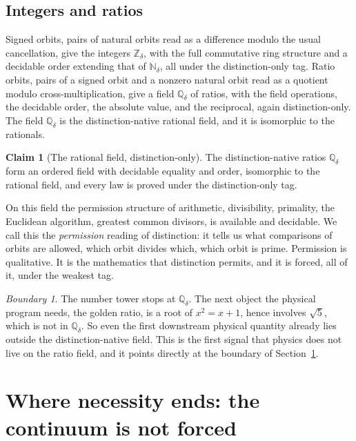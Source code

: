 \documentclass[11pt,a4paper]{article}
\theoremstyle{definition}
\newtheorem{claim}[theorem]{Claim}
\theoremstyle{remark}
\newtheorem*{boundary}{Boundary}
\newcommand{\Ndelta}{\mathbb{N}_{\delta}}
\newcommand{\Zdelta}{\mathbb{Z}_{\delta}}
\newcommand{\Qdelta}{\mathbb{Q}_{\delta}}
\begin{document}
\subsection{Integers and ratios}

Signed orbits, pairs of natural orbits read as a difference modulo the usual
cancellation, give the integers $\Zdelta$, with the full commutative ring
structure and a decidable order extending that of $\Ndelta$, all under the
distinction-only tag. Ratio orbits, pairs of a signed orbit and a nonzero natural
orbit read as a quotient modulo cross-multiplication, give a field $\Qdelta$ of
ratios, with the field operations, the decidable order, the absolute value, and
the reciprocal, again distinction-only. The field $\Qdelta$ is the
distinction-native rational field, and it is isomorphic to the rationals.

\begin{claim}[The rational field, distinction-only]\label{cl:rat}
The distinction-native ratios $\Qdelta$ form an ordered field with decidable
equality and order, isomorphic to the rational field, and every law is proved
under the distinction-only tag.
\end{claim}

On this field the permission structure of arithmetic, divisibility, primality, the
Euclidean algorithm, greatest common divisors, is available and decidable. We call
this the \emph{permission} reading of distinction: it tells us what comparisons of
orbits are allowed, which orbit divides which, which orbit is prime. Permission is
qualitative. It is the mathematics that distinction permits, and it is forced, all
of it, under the weakest tag.

\begin{boundary}
The number tower stops at $\Qdelta$. The next object the physical program needs,
the golden ratio, is a root of $x^2 = x + 1$, hence involves $\sqrt 5$, which is
not in $\Qdelta$. So even the first downstream physical quantity already lies
outside the distinction-native field. This is the first signal that physics does
not live on the ratio field, and it points directly at the boundary of
Section~\ref{sec:continuum}.
\end{boundary}

\section{Where necessity ends: the continuum is not forced}\label{sec:continuum}
\end{document}

